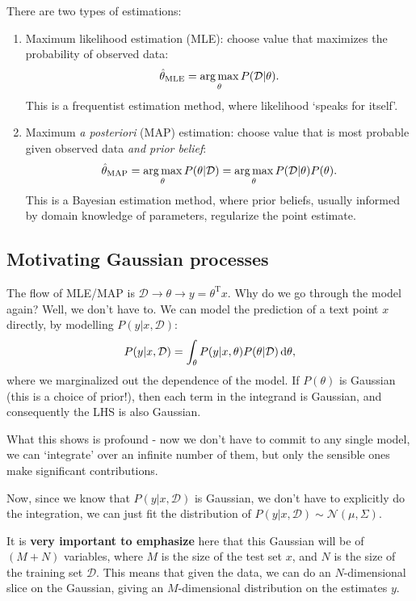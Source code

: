 \documentclass{article}
\begin{document}
There are two types of estimations:
\begin{enumerate}
    \item Maximum likelihood estimation (MLE): choose value that maximizes the probability of observed data:
    \begin{equation}
        \hat{\theta}_{\mathrm{MLE}}=\operatorname*{arg\,max}_{\theta} P(\mathcal{D}|\theta).
    \end{equation}
    This is a frequentist estimation method, where likelihood `speaks for itself'.
    \item Maximum \textit{a posteriori} (MAP) estimation: choose value that is most probable given observed data \textit{and prior belief}:
    \begin{equation}
        \hat{\theta}_{\mathrm{MAP}}=\operatorname*{arg\,max}_{\theta}P(\theta|\mathcal{D})=\operatorname*{arg\,max}_{\theta} P(\mathcal{D}|\theta)P(\theta).
    \end{equation}
    This is a Bayesian estimation method, where prior beliefs, usually informed by domain knowledge of parameters, regularize the point estimate.
\end{enumerate}

\subsection{Motivating Gaussian processes}
The flow of MLE/MAP is $\mathcal{D}\rightarrow \theta\rightarrow y=\theta^{\mathrm{T}}x$. Why do we go through the model again? Well, we don't have to. We can model the prediction of a text point $x$ directly, by modelling $P(y|x,\mathcal{D})$:
\begin{equation}
P(y|x,\mathcal{D})=\int_{\theta}P(y|x,\theta)P(\theta|\mathcal{D})\dl\theta,
\end{equation}
where we marginalized out the dependence of the model. If $P(\theta)$ is Gaussian (this is a choice of prior!), then each term in the integrand is Gaussian, and consequently the LHS is also Gaussian. 

What this shows is profound - now we don't have to commit to any single model, we can `integrate' over an infinite number of them, but only the sensible ones make significant contributions.

Now, since we know that $P(y|x,\mathcal{D})$ is Gaussian, we don't have to explicitly do the integration, we can just fit the distribution of $P(y|x,\mathcal{D})\sim\mathcal{N}(\mu,\Sigma)$. 

It is \textbf{very important to emphasize} here that this Gaussian will be of $(M+N)$ variables, where $M$ is the size of the test set $x$, and $N$ is the size of the training set $\mathcal{D}$. This means that given the data, we can do an $N$-dimensional slice on the Gaussian, giving an $M$-dimensional distribution on the estimates $y$.
\end{document}

